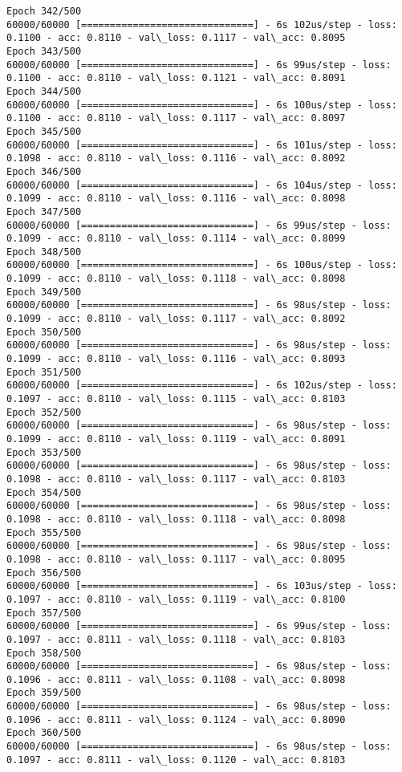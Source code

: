 \documentclass[11pt]{article}
\begin{document}
\begin{Verbatim}[commandchars=\\\{\}]
Epoch 342/500
60000/60000 [==============================] - 6s 102us/step - loss: 0.1100 - acc: 0.8110 - val\_loss: 0.1117 - val\_acc: 0.8095
Epoch 343/500
60000/60000 [==============================] - 6s 99us/step - loss: 0.1100 - acc: 0.8110 - val\_loss: 0.1121 - val\_acc: 0.8091
Epoch 344/500
60000/60000 [==============================] - 6s 100us/step - loss: 0.1100 - acc: 0.8110 - val\_loss: 0.1117 - val\_acc: 0.8097
Epoch 345/500
60000/60000 [==============================] - 6s 101us/step - loss: 0.1098 - acc: 0.8110 - val\_loss: 0.1116 - val\_acc: 0.8092
Epoch 346/500
60000/60000 [==============================] - 6s 104us/step - loss: 0.1099 - acc: 0.8110 - val\_loss: 0.1116 - val\_acc: 0.8098
Epoch 347/500
60000/60000 [==============================] - 6s 99us/step - loss: 0.1099 - acc: 0.8110 - val\_loss: 0.1114 - val\_acc: 0.8099
Epoch 348/500
60000/60000 [==============================] - 6s 100us/step - loss: 0.1099 - acc: 0.8110 - val\_loss: 0.1118 - val\_acc: 0.8098
Epoch 349/500
60000/60000 [==============================] - 6s 98us/step - loss: 0.1099 - acc: 0.8110 - val\_loss: 0.1117 - val\_acc: 0.8092
Epoch 350/500
60000/60000 [==============================] - 6s 98us/step - loss: 0.1099 - acc: 0.8110 - val\_loss: 0.1116 - val\_acc: 0.8093
Epoch 351/500
60000/60000 [==============================] - 6s 102us/step - loss: 0.1097 - acc: 0.8110 - val\_loss: 0.1115 - val\_acc: 0.8103
Epoch 352/500
60000/60000 [==============================] - 6s 98us/step - loss: 0.1099 - acc: 0.8110 - val\_loss: 0.1119 - val\_acc: 0.8091
Epoch 353/500
60000/60000 [==============================] - 6s 98us/step - loss: 0.1098 - acc: 0.8110 - val\_loss: 0.1117 - val\_acc: 0.8103
Epoch 354/500
60000/60000 [==============================] - 6s 98us/step - loss: 0.1098 - acc: 0.8110 - val\_loss: 0.1118 - val\_acc: 0.8098
Epoch 355/500
60000/60000 [==============================] - 6s 98us/step - loss: 0.1098 - acc: 0.8110 - val\_loss: 0.1117 - val\_acc: 0.8095
Epoch 356/500
60000/60000 [==============================] - 6s 103us/step - loss: 0.1097 - acc: 0.8110 - val\_loss: 0.1119 - val\_acc: 0.8100
Epoch 357/500
60000/60000 [==============================] - 6s 99us/step - loss: 0.1097 - acc: 0.8111 - val\_loss: 0.1118 - val\_acc: 0.8103
Epoch 358/500
60000/60000 [==============================] - 6s 98us/step - loss: 0.1096 - acc: 0.8111 - val\_loss: 0.1108 - val\_acc: 0.8098
Epoch 359/500
60000/60000 [==============================] - 6s 98us/step - loss: 0.1096 - acc: 0.8111 - val\_loss: 0.1124 - val\_acc: 0.8090
Epoch 360/500
60000/60000 [==============================] - 6s 98us/step - loss: 0.1097 - acc: 0.8111 - val\_loss: 0.1120 - val\_acc: 0.8103

\end{Verbatim}
\end{document}
